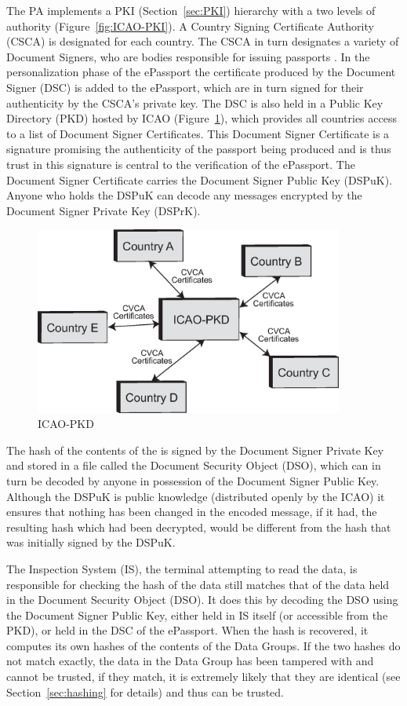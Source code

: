 \documentclass[12pt]{article}
\begin{document}
The PA implements a PKI (Section~\ref{sec:PKI}) hierarchy with a two levels of authority (Figure~\ref{fig:ICAO-PKI}). A Country Signing Certificate Authority (CSCA) is designated for each country. The CSCA in turn designates a variety of Document Signers, who are bodies responsible for issuing passports \cite{Anonymous:2011vj}. In the personalization phase of the ePassport the certificate produced by the Document Signer (DSC) is added to the ePassport, which are in turn signed for their authenticity by the CSCA's private key. The DSC is also held in a Public Key Directory (PKD) hosted by ICAO (Figure~\ref{fig:PKD}), which provides all countries access to a list of Document Signer Certificates. This Document Signer Certificate is a signature promising the authenticity of the passport being produced and is thus trust in this signature is central to the verification of the ePassport. The Document Signer Certificate carries the Document Signer Public Key (DSPuK). Anyone who holds the DSPuK can decode any messages encrypted by the Document Signer Private Key (DSPrK).

\begin{figure}
\centering
\includegraphics[width=4in]{ICAO-PKD.eps}
\caption{ICAO-PKD}
\label{fig:PKD}
\end{figure}

The hash of the contents of the is signed by the Document Signer Private Key and stored in a file called the Document Security Object (DSO), which can in turn be decoded by anyone in possession of the Document Signer Public Key. Although the DSPuK is public knowledge (distributed openly by the ICAO) it ensures that nothing has been changed in the encoded message, if it had, the resulting hash which had been decrypted, would be different from the hash that was initially signed by the DSPuK.

The Inspection System (IS), the terminal attempting to read the data, is responsible for checking the hash of the data still matches that of the data held in the Document Security Object (DSO). It does this by decoding the DSO using the Document Signer Public Key, either held in IS itself (or accessible from the PKD), or held in the DSC of the ePassport. When the hash is recovered, it computes its own hashes of the contents of the Data Groups. If the two hashes do not match exactly, the data in the Data Group has been tampered with and cannot be trusted, if they match, it is extremely likely that they are identical (see Section~\ref{sec:hashing} for details) and thus can be trusted. 
\end{document}
